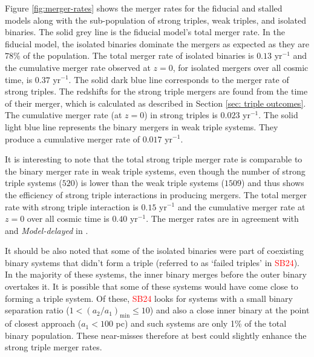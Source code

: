 \documentclass[twocolumn,linenumbers]{aastex701}
\newcommand{\SB}{\textcolor{red}{SB24}}
\begin{document}
Figure \ref{fig:merger-rates} shows the merger rates for the fiducial and stalled models along with the sub-population of strong triples, weak triples, and isolated binaries. The solid grey line is the fiducial model's total merger rate. In the fiducial model, the isolated binaries dominate the mergers as expected as they are $78 \%$ of the population. The total merger rate of isolated binaries is $0.13$ yr$^{-1}$ and the cumulative merger rate observed at $z=0$, for isolated mergers over all cosmic time, is $0.37$ yr$^{-1}$. The solid dark blue line corresponds to the merger rate of strong triples. The redshifts for the strong triple mergers are found from the time of their merger, which is calculated as described in Section \ref{sec: triple outcomes}. The cumulative merger rate (at $z=0$) in strong triples is  $ 0.023$ yr$^{-1}$. The solid light blue line represents the binary mergers in weak triple systems. They produce a cumulative merger rate of $ 0.017$  yr$^{-1}$. 

It is interesting to note that the total strong triple merger rate is comparable to the binary merger rate in weak triple systems, even though the number of strong triple systems ($520$) is lower than the weak triple systems ($1509$) and thus shows the efficiency of strong triple interactions in producing mergers. The total merger rate with strong triple interaction is $0.15$ yr$^{-1}$ and the cumulative merger rate at $z=0$ over all cosmic time is $0.40$ yr$^{-1}$. The merger rates are in agreement with \citet{Blecha2016,Katz2020,sayeb_massive_2021} and \emph{Model-delayed} in \cite{bonetti_post-newtonian_2019}. 

It should be also noted that some of the isolated binaries were part of coexisting binary systems that didn't form a triple (referred to as `failed triples' in \SB{}). In the majority of these systems, the inner binary merges before the outer binary overtakes it. It is possible that some of these systems would have come close to forming a triple system. Of these, \SB{} looks for systems with a small binary separation ratio ($1 < (a_2/a_1)_{\text{min}} \leq 10$) and also a close inner binary at the point of closest approach ($a_1 < 100$ pc) and such systems are only 1\% of the total binary population. These near-misses therefore at best could slightly enhance
the strong triple merger rates. 
\end{document}

